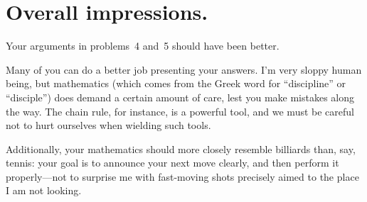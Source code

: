 \documentclass[12pt]{article}
\begin{document}
\section*{Overall impressions.}

Your arguments in problems~4 and~5 should have been better.

Many of you can do a better job presenting your answers.  I'm very
sloppy human being, but mathematics (which comes from the Greek word
for ``discipline'' or ``disciple'') does demand a certain amount of
care, lest you make mistakes along the way.  The chain rule, for
instance, is a powerful tool, and we must be careful not to hurt
ourselves when wielding such tools.

Additionally, your mathematics should more closely resemble billiards
than, say, tennis: your goal is to announce your next move clearly,
and then perform it properly---not to surprise me with fast-moving
shots precisely aimed to the place I am not looking.
\end{document}

